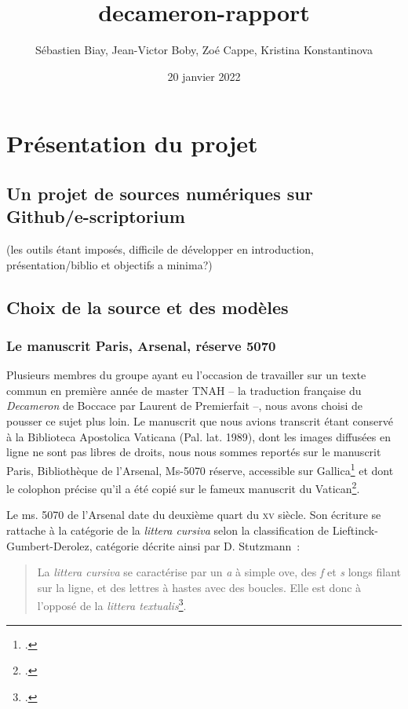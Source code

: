 \documentclass{article}
\title{decameron-rapport}
\author{Sébastien Biay, Jean-Victor Boby, Zoé Cappe, Kristina Konstantinova}
\date{20 janvier 2022}
\newcommand{\siecle}[1]{\textsc{#1}\ieme}
\begin{document}
	
	\maketitle
	
	\section{Présentation du projet}
	\subsection{Un projet de sources numériques sur Github/e-scriptorium}
	(les outils étant imposés, difficile de développer en introduction, présentation/biblio et objectifs a minima?)
	
	\subsection{Choix de la source et des modèles}
	
	\subsubsection{Le manuscrit Paris, Arsenal, réserve 5070}
	Plusieurs membres du groupe ayant eu l'occasion de travailler sur un texte commun en première année de master TNAH – la traduction française du \textit{Decameron} de Boccace par Laurent de Premierfait –, nous avons choisi de pousser ce sujet plus loin.
	Le manuscrit que nous avions transcrit étant conservé à la Biblioteca Apostolica Vaticana (Pal. lat. 1989), dont les images diffusées en ligne ne sont pas libres de droits, nous nous sommes reportés sur le manuscrit Paris, Bibliothèque de l'Arsenal, Ms-5070 réserve, accessible sur Gallica\footcite{gallicaParisBibliothequeArsenal,bnfarchivesetmanuscritsMs5070BoccaceDecameron} et dont le colophon précise qu'il a été copié sur le fameux manuscrit du Vatican\footcite{irhtsectionromaneNoticeParisBibliotheque2012}.
	
	Le ms. 5070 de l'Arsenal date du deuxième quart du \siecle{xv} siècle. Son écriture se rattache à la catégorie de la \textit{littera cursiva} selon la classification de Lieftinck-Gumbert-Derolez, catégorie décrite ainsi par D. Stutzmann~:
	\begin{quotation}La \textit{littera cursiva} se caractérise par un \textit{a} à simple ove, des \textit{f} et \textit{s} longs filant sur la ligne, et des lettres à hastes avec des boucles. Elle est donc à l’opposé de la \textit{littera textualis}\footcite{stutzmannEcrituresGothiquesLivresques2022}.\end{quotation}
	
\end{document}
